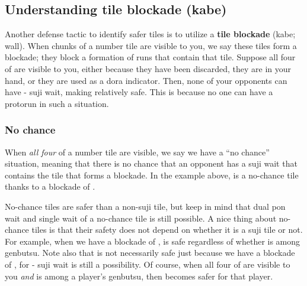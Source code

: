 {{\bigskip
\subsection{Understanding tile blockade ({\jap kabe})} \label{sec:blockade}
Another defense tactic to identify safer tiles is to utilize a {\bf tile blockade} ({\jap kabe}; wall). When chunks of a number tile are visible to you, we say these tiles form a blockade; they block a formation of runs that contain that tile. Suppose all four of {\LARGE{}} are visible to you, either because they have been discarded, they are in your hand, or they are used as a {\jap dora} indicator.
Then, none of your opponents can have {\LARGE{}-} {\jap suji} wait, making {\LARGE{}} relatively safe. This is because no one can have a protorun {\LARGE{}} in such a situation. 

\subsubsection{No chance}
When \emph{all four} of a number tile are visible, we say we have a ``no chance'' situation, meaning that there is no chance that an opponent has a {\jap suji} wait that contains the tile that forms a blockade. In the example above, {\LARGE{}} is a no-chance tile thanks to a blockade of {\LARGE{}}. 

\bigskip
No-chance tiles are safer than a non-{\jap suji} tile, but keep in mind that dual {\jap pon} wait and single wait of a no-chance tile is still possible. 
A nice thing about no-chance tiles is that their safety does not depend on whether it is a {\jap suji} tile or not. For example, when we have a blockade of {\LARGE{}}, {\LARGE{}} is safe regardless of whether {\LARGE{}} is among {\jap genbutsu}. Note also that {\LARGE{}} is not necessarily safe just because we have a blockade of {\LARGE{}}, for {\LARGE{}-} {\jap suji} wait is still a possibility. 
Of course, when all four of {\LARGE{}} are visible to you \emph{and} {\LARGE{}} is among a player's {\jap genbutsu}, then {\LARGE{}} becomes safer for that player. 

}}
